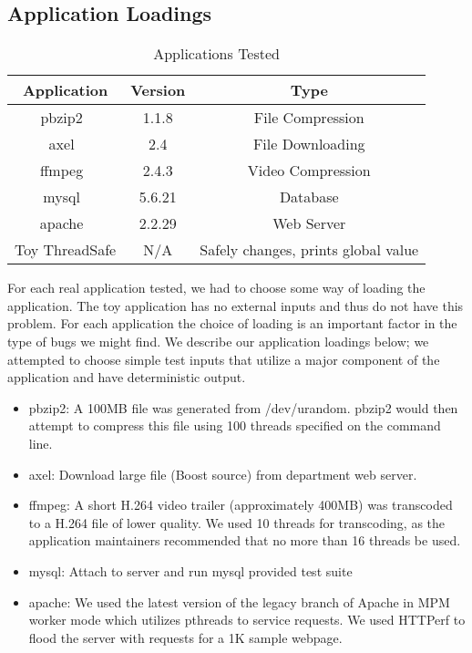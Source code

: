 \documentclass[10pt,]{article} %
\begin{document}
\subsection{Application Loadings}
\begin{table}
\centering
\begin{tabular}{ |c|c|c| }
\hline
Application & Version &Type \\ \hline \hline
pbzip2~\cite{pbzip2} & 1.1.8 & File Compression \\ \hline
axel~\cite{axel}     & 2.4    & File Downloading \\ \hline
ffmpeg~\cite{ffmpeg} & 2.4.3  & Video Compression \\ \hline
mysql~\cite{mysql}  & 5.6.21 & Database\\ \hline
apache~\cite{apache}& 2.2.29 & Web Server\\ \hline
Toy ThreadSafe & N/A & Safely changes, prints global value \\ \hline
\end{tabular}
\caption{Applications Tested}
\label{appsTest}
\end{table}





For each real application tested, we had to choose some way of loading the application.  The toy application has no external inputs and thus do not have this problem.  For each application the choice of loading is an important factor in the type of bugs we might find.  We describe our application loadings below; we attempted to choose simple test inputs that utilize a major component of the application and have deterministic output. 

\begin{itemize}
  \item pbzip2: A 100MB file was generated from /dev/urandom. pbzip2 would then attempt to compress this file using 100 threads specified on the command line. 
  \item axel: Download large file (Boost source) from department web server. 
  \item ffmpeg: A short H.264 video trailer (approximately 400MB) was transcoded to a H.264 file of lower quality. We used 10 threads for transcoding, as the application maintainers recommended that no more than 16 threads be used. 
  \item mysql: Attach to server and run mysql provided test suite 
  \item apache: We used the latest version of the legacy branch of Apache in MPM worker mode which utilizes pthreads to service requests. We used HTTPerf to flood the server with requests for a 1K sample webpage.
\end{itemize}
\end{document}
